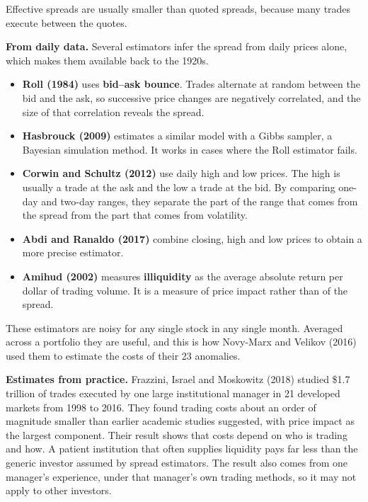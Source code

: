 Effective spreads are usually smaller than quoted spreads, because many trades execute between the quotes.

\textbf{From daily data.} Several estimators infer the spread from daily prices alone, which makes them available back to the 1920s.

\begin{itemize}
  \item \textbf{Roll (1984)} uses \textbf{bid--ask bounce}. Trades alternate at random between the bid and the ask, so successive price changes are negatively correlated, and the size of that correlation reveals the spread.
  \item \textbf{Hasbrouck (2009)} estimates a similar model with a Gibbs sampler, a Bayesian simulation method. It works in cases where the Roll estimator fails.
  \item \textbf{Corwin and Schultz (2012)} use daily high and low prices. The high is usually a trade at the ask and the low a trade at the bid. By comparing one-day and two-day ranges, they separate the part of the range that comes from the spread from the part that comes from volatility.
  \item \textbf{Abdi and Ranaldo (2017)} combine closing, high and low prices to obtain a more precise estimator.
  \item \textbf{Amihud (2002)} measures \textbf{illiquidity} as the average absolute return per dollar of trading volume. It is a measure of price impact rather than of the spread.
\end{itemize}

These estimators are noisy for any single stock in any single month. Averaged across a portfolio they are useful, and this is how Novy-Marx and Velikov (2016) used them to estimate the costs of their 23 anomalies.

\textbf{Estimates from practice.} Frazzini, Israel and Moskowitz (2018) studied \$1.7 trillion of trades executed by one large institutional manager in 21 developed markets from 1998 to 2016. They found trading costs about an order of magnitude smaller than earlier academic studies suggested, with price impact as the largest component. Their result shows that costs depend on who is trading and how. A patient institution that often supplies liquidity pays far less than the generic investor assumed by spread estimators. The result also comes from one manager's experience, under that manager's own trading methods, so it may not apply to other investors.

